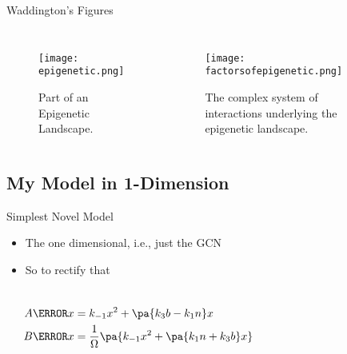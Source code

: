 \documentclass[aspectratio=169, onlytextwidth,  notheorems, sOuRcEs, fleqn, leqno, ]{RUCPresentation}
\newcounter{reaction}
\begin{document}
\begin{frame}{Waddington's Figures}

    \begin{columns}%

        \column{0.5\framewidth}
    \begin{figure}[htbp]
    \centering
    \texttt{[image: epigenetic.png]}
    \caption{
        Part of an Epigenetic Landscape.
    }
    \end{figure}

        \column{0.5\framewidth}
    \begin{figure}[htbp]
    \centering
    \texttt{[image: factorsofepigenetic.png]}
    \caption{
        The complex system of interactions underlying the epigenetic landscape.
    }
    \end{figure}

    \end{columns}

\end{frame}



\subsection{My Model in 1-Dimension}
\begin{frame}{Simplest Novel Model}

    \begin{itemize}
        \item The one dimensional, i.e., just the GCN
        \item So to rectify that
    \end{itemize}

    \begin{columns}%

        \column{0.5\framewidth}

        \begin{reactiontable}
        \end{reactiontable}

        \column{0.4\framewidth}

        \begin{align*}
            A\of x &= k_{-1} x^2 + \pa{ k_3 b - k_1 n } x
            \\
            B\of x &= {1 \over \Omega} \pa{k_{-1} x^2 + \pa{ k_1 n + k_3 b } x}
        \end{align*}

    \end{columns}

\end{frame}
\end{document}
